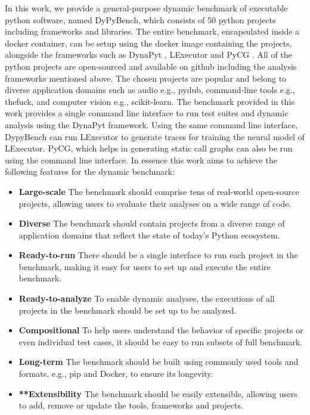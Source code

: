 In this work, we provide a general-purpose dynamic benchmark of executable python software, named DyPyBench, which consists of 50 python projects including frameworks and libraries. The entire benchmark, encapsulated inside a docker container, can be setup using the docker image containing the projects, alongside the frameworks such as DynaPyt \cite{DynaPyt2022}, LExecutor \cite{LExecutor_2023} and PyCG \cite{PyCG_2021}. All of the python projects are open-sourced and available on github \cite{github} including the analysis frameworks mentioned above. The chosen projects are popular and belong to diverse application domains such as audio e.g., pydub, command-line tools e.g., thefuck, and computer vision e.g., scikit-learn. The benchmark provided in this work provides a single command line interface to run test suites and dynamic analysis using the DynaPyt framework. Using the same command line interface, DypyBench can run LExecutor to generate traces for training the neural model of LExecutor. PyCG, which helps in generating static call graphs can also be run using the command line interface. In essence this work aims to achieve the following features for the dynamic benchmark:
\begin{itemize}
    \item \textbf{Large-scale} The benchmark should comprise tens of real-world open-source projects, allowing users to evaluate their analyses on a wide range of code.
    \item \textbf{Diverse} The benchmark should contain projects from a diverse range of application domains that reflect the state of today's Python ecosystem.
    \item \textbf{Ready-to-run} There should be a single interface to run each project in the benchmark, making it easy for users to set up and execute the entire benchmark.
    \item \textbf{Ready-to-analyze} To enable dynamic analyses, the executions of all projects in the benchmark should be set up to be analyzed.
    \item \textbf{Compositional} To help users understand the behavior of specific projects or even individual test cases, it should be easy to run subsets of full benchmark.
    \item \textbf{Long-term} The benchmark should be built using commonly used tools and formats, e.g., pip and Docker, to ensure its longevity.
    \item \textbf{**Extensibility} The benchmark should be easily extensible, allowing users to add, remove or update the tools, frameworks and projects.  
\end{itemize}

